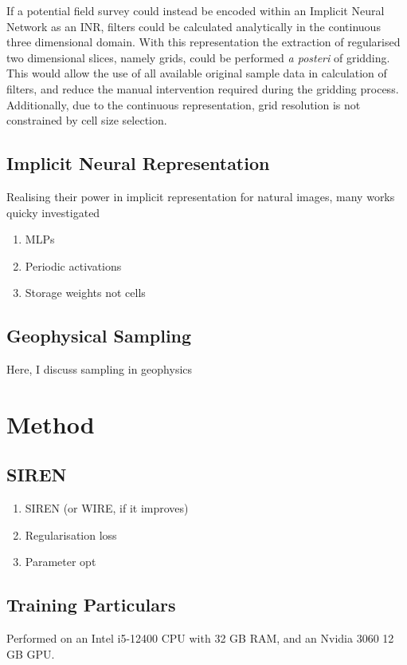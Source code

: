\documentclass{article}
\begin{document}
    If a potential field survey could instead be encoded within an Implicit Neural Network as an INR, filters could be calculated analytically in the continuous three dimensional domain.
    With this representation the extraction of regularised two dimensional slices, namely grids, could be performed \emph{a posteri} of gridding.
    This would allow the use of all available original sample data in calculation of filters, and reduce the manual intervention required during the gridding process.
    Additionally, due to the continuous representation, grid resolution is not constrained by cell size selection.
    



\subsection{Implicit Neural Representation}
\label{sec:inr}
Realising their power in implicit representation for natural images, many works quicky investigated 
\begin{enumerate}
    \item MLPs
    \item Periodic activations
    \item Storage weights not cells
\end{enumerate}

\subsection{Geophysical Sampling}
\label{sec:geo_sampling}
Here, I discuss sampling in geophysics 

\section{Method}
\subsection{SIREN}
\begin{enumerate}
    \item SIREN (or WIRE, if it improves)
    \item Regularisation loss
    \item Parameter opt
\end{enumerate}

\subsection{Training Particulars}
Performed on an Intel i5-12400 CPU with 32 GB RAM, and an Nvidia 3060 12 GB GPU. 
\end{document}
